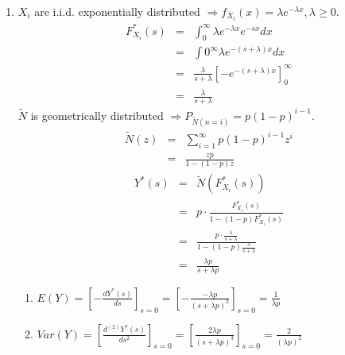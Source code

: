 \documentclass[UTF8,nofonts]{ctexart}
\begin{document}
\begin{enumerate}
{\begin{enumerate}
      \end{enumerate}
    }
    \item{
      $X_{i}$ are i.i.d. exponentially distributed $\Rightarrow f_{X_{i}}(x) = \lambda e^{-\lambda x}, \lambda \geq 0$.
      \begin{eqnarray*}
        F_{X_{i}}^{*}(s) &=& \int_{0}^{\infty}\lambda e^{-\lambda x}e^{-sx}dx \\
        &=& \int{0}^{\infty}\lambda e^{-(s + \lambda) x}dx \\
        &=& \frac{\lambda}{s + \lambda}[-e^{-(s + \lambda)x}]_{0}^{\infty} \\
        &=& \frac{\lambda}{s + \lambda}
      \end{eqnarray*}
      $\tilde{N}$ is geometrically distributed $\Rightarrow P_{\tilde{N}(n = i)} = p(1 - p)^{i - 1}$.
      \begin{eqnarray*}
        \tilde{N}(z) &=& \sum_{i=1}^{\infty}p(1 - p)^{i - 1}z^{i} \\
        &=& \frac{zp}{1 - (1 - p)z}
      \end{eqnarray*}
      \begin{eqnarray*}
        Y^{*}(s) &=& \tilde{N}(F_{X_{i}}^{*}(s)) \\
        &=& p \cdot \frac{F_{X_{i}}^{*}(s)}{1 - (1 - p)F_{X_{i}}^{*}(s)} \\
        &=& \frac{p \cdot \frac{\lambda}{s + \lambda}}{1 - (1 - p)\frac{\lambda}{s + \lambda}} \\
        &=& \frac{\lambda p}{s + \lambda p}
      \end{eqnarray*}
      \begin{enumerate}
        \item{
          $E(Y) = [-\frac{dY^{*}(s)}{ds}]_{s=0} = [-\frac{-\lambda p}{(s + \lambda p)^2}]_{s=0} = \frac{1}{\lambda p}$
        }
        \item{
          $Var(Y) = [\frac{d^{(2)}Y^{*}(s)}{ds^2}]_{s=0} = [\frac{2\lambda p}{(s + \lambda p)^3}]_{s=0} = \frac{2}{(\lambda p)^2}$
        }
      \end{enumerate}
    }
  \end{enumerate}
\end{document}
